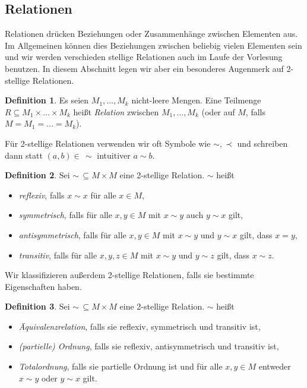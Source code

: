 \documentclass[11pt, a4paper]{article}
\theoremstyle{definition}
\newtheorem{definition}{Definition}[section]
\theoremstyle{plain}
\numberwithin{equation}{section}
\begin{document}
\subsection{Relationen}\label{sec:pre_relations}
Relationen drücken Beziehungen oder Zusammenhänge zwischen Elementen aus. Im Allgemeinen können dies Beziehungen zwischen beliebig vielen Elementen sein und wir werden verschieden stellige Relationen auch im Laufe der Vorlesung benutzen. In diesem Abschnitt legen wir aber ein besonderes Augenmerk auf 2-stellige Relationen.
\begin{definition}
	Es seien $M_1, \ldots, M_k$ nicht-leere Mengen. Eine Teilmenge $R \subseteq M_1 \times \ldots \times M_k$ heißt \textit{Relation} zwischen $M_1, \ldots, M_k$ (oder auf $M$, falls $M = M_1 = \ldots = M_k$).
\end{definition}
Für 2-stellige Relationen verwenden wir oft Symbole wie $\sim, \prec$ und schreiben dann statt $(a, b) \in\, \sim$ intuitiver $a \sim b$.
\begin{definition}
	Sei $\sim \,\subseteq M \times M$ eine 2-stellige Relation. $\sim$ heißt
	\begin{itemize}
		\item \textit{reflexiv}, falls $x \sim x$ für alle $x \in M$,
		\item \textit{symmetrisch}, falls für alle $x, y \in M$ mit $x \sim y$ auch $y \sim x$ gilt,
		\item \textit{antisymmetrisch}, falls für alle $x, y \in M$ mit $x \sim y$ und $y \sim x$ gilt, dass $x = y$,
		\item \textit{transitiv}, falls für alle $x, y, z \in M$ mit $x \sim y$ und $y \sim z$ gilt, dass $x \sim z$.
	\end{itemize}
\end{definition}
Wir klassifizieren außerdem 2-stellige Relationen, falls sie bestimmte Eigenschaften haben.
\begin{definition}\label{def:relations}
	Sei $\sim \,\subseteq M \times M$ eine 2-stellige Relation. $\sim$ heißt
	\begin{itemize}
		\item \textit{Äquivalenzrelation}, falls sie reflexiv, symmetrisch und transitiv ist,
		\item \textit{(partielle) Ordnung}, falls sie reflexiv, antisymmetrisch und transitiv ist,
		\item \textit{Totalordnung}, falls sie partielle Ordnung ist und für alle $x, y \in M$ entweder $x \sim y$ oder $y \sim x$ gilt. 
	\end{itemize}	 
\end{definition}
\end{document}
